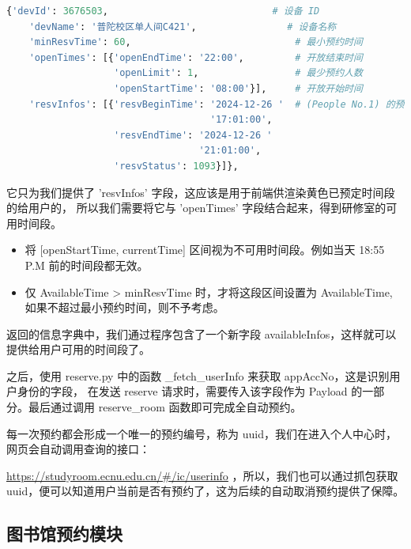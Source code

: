 \documentclass[14pt,a4paper,UTF8,twoside]{article}
\renewcommand{\texttt}[1]{{\color{blue}\ttfamily#1}}
\begin{document}
\begin{lstlisting}[language=python]
    {'devId': 3676503,                             # 设备 ID
    'devName': '普陀校区单人间C421',                # 设备名称
    'minResvTime': 60,                             # 最小预约时间
    'openTimes': [{'openEndTime': '22:00',         # 开放结束时间
                   'openLimit': 1,                 # 最少预约人数
                   'openStartTime': '08:00'}],     # 开放开始时间
    'resvInfos': [{'resvBeginTime': '2024-12-26 '  # (People No.1) 的预约信息
                                    '17:01:00',
                   'resvEndTime': '2024-12-26 '
                                  '21:01:00',
                   'resvStatus': 1093}]},
\end{lstlisting}

它只为我们提供了 \texttt{'resvInfos'} 字段，这应该是用于前端供渲染黄色已预定时间段的给用户的，
所以我们需要将它与 \texttt{'openTimes'} 字段结合起来，得到研修室的可用时间段。

\begin{note}
    \begin{itemize}
        \item 将 [openStartTime, currentTime] 区间视为不可用时间段。例如当天 18:55 P.M 前的时间段都无效。
        \item 仅 AvailableTime > minResvTime 时，才将这段区间设置为 AvailableTime, 如果不超过最小预约时间，则不予考虑。
    \end{itemize}
\end{note}

返回的信息字典中，我们通过程序包含了一个新字段 \texttt{availableInfos}，这样就可以提供给用户可用的时间段了。

之后，使用 \texttt{reserve.py} 中的函数 \texttt{\_fetch\_userInfo} 来获取 \texttt{appAccNo}，这是识别用户身份的字段，
在发送 \texttt{reserve} 请求时，需要传入该字段作为 Payload 的一部分。最后通过调用 \texttt{reserve\_room} 函数即可完成全自动预约。

\begin{note}
每一次预约都会形成一个唯一的预约编号，称为 \texttt{uuid}，我们在进入个人中心时，网页会自动调用查询的接口：

\href{https://studyroom.ecnu.edu.cn/#/ic/userinfo}{\underline{https://studyroom.ecnu.edu.cn/\#/ic/userinfo}}
，所以，我们也可以通过抓包获取 uuid，便可以知道用户当前是否有预约了，这为后续的自动取消预约提供了保障。
\end{note}

\subsection{图书馆预约模块}
\end{document}
